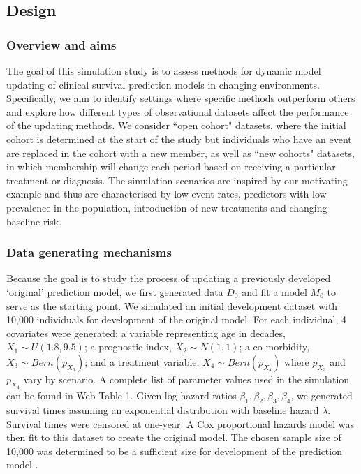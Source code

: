 \documentclass[]{article}
\begin{document}
\subsection{Design}


\subsubsection{Overview and aims}

The goal of this simulation study is to assess methods for dynamic model updating of clinical survival prediction models in changing environments.  Specifically, we aim to identify settings where specific methods outperform others and explore how different types of observational datasets affect the performance of the updating methods. We consider ``open cohort" datasets, where the initial cohort is determined at the start of the study but individuals who have an event are replaced in the cohort with a new member, as well as ``new cohorts" datasets, in which membership will change each period based on receiving a particular treatment or diagnosis.  The simulation scenarios are inspired by our motivating example and thus are characterised by low event rates, predictors with low prevalence in the population, introduction of new treatments and changing baseline risk. 


\subsubsection{Data generating mechanisms}

Because the goal is to study the process of updating a previously developed `original' prediction model, we first generated data $D_0$ and fit a model $M_0$ to serve as the starting point. We simulated an initial development dataset with 10,000 individuals for development of the original model. For each individual, 4 covariates were generated: a variable representing age in decades, $X_1 \sim U(1.8, 9.5)$; a prognostic index, $X_2 \sim N(1,1)$; a co-morbidity, $X_3 \sim Bern(p_{X_3})$; and a treatment variable, $X_4 \sim Bern(p_{X_4})$ where $p_{X_3}$ and $p_{X_4}$ vary by scenario. A complete list of parameter values used in the simulation can be found in Web Table 1. Given log hazard ratios $\beta_1, \beta_2, \beta_3, \beta_4$, we generated survival times assuming an exponential distribution with baseline hazard $\lambda$. Survival times were censored at one-year. A Cox proportional hazards model was then fit to this dataset to create the original model. The chosen sample size of 10,000 was determined to be a sufficient size for development of the prediction model \citep{Riley2019}.
\end{document}
